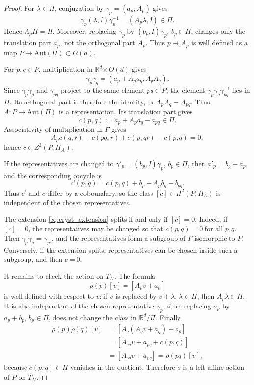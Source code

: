 \documentclass[10pt,a4paper]{amsart}
\begin{document}
\begin{proof}
	For \(\lambda\in\Pi\), conjugation by \(\gamma_p=(a_p,A_p)\) gives
	\[
	\gamma_p(\lambda,I)\gamma_p^{-1}=(A_p\lambda,I)\in\Pi.
	\]
	Hence \(A_p\Pi=\Pi\). Moreover, replacing \(\gamma_p\) by \((b_p,I)\gamma_p\), \(b_p\in\Pi\), changes only the translation part \(a_p\), not the orthogonal part \(A_p\). Thus \(p\mapsto A_p\) is well defined as a map \(P\to\mathrm{Aut}(\Pi)\subset O(d)\).
	
	For \(p,q\in P\), multiplication in \(\mathbb R^d\rtimes O(d)\) gives
	\[
	\gamma_p\gamma_q
	=
	(a_p+A_pa_q,A_pA_q).
	\]
	Since \(\gamma_p\gamma_q\) and \(\gamma_{pq}\) project to the same element \(pq\in P\), the element \(\gamma_p\gamma_q\gamma_{pq}^{-1}\) lies in \(\Pi\). Its orthogonal part is therefore the identity, so \(A_pA_q=A_{pq}\). Thus \(A:P\to\mathrm{Aut}(\Pi)\) is a representation. Its translation part gives
	\[
	c(p,q):=a_p+A_pa_q-a_{pq}\in\Pi.
	\]
	Associativity of multiplication in \(\Gamma\) gives
	\[
	A_pc(q,r)-c(pq,r)+c(p,qr)-c(p,q)=0,
	\]
	hence \(c\in Z^2(P,\Pi_A)\).
	
	If the representatives are changed to \(\gamma'_p=(b_p,I)\gamma_p\), \(b_p\in\Pi\), then \(a'_p=b_p+a_p\), and the corresponding cocycle is
	\[
	c'(p,q)
	=
	c(p,q)+b_p+A_pb_q-b_{pq}.
	\]
	Thus \(c'\) and \(c\) differ by a coboundary, so the class \([c]\in H^2(P,\Pi_A)\) is independent of the chosen representatives.
	
	The extension \eqref{eq:cryst_extension} splits if and only if \([c]=0\). Indeed, if \([c]=0\), the representatives may be changed so that \(c(p,q)=0\) for all \(p,q\). Then \(\gamma_p\gamma_q=\gamma_{pq}\), and the representatives form a subgroup of \(\Gamma\) isomorphic to \(P\). Conversely, if the extension splits, representatives can be chosen inside such a subgroup, and then \(c=0\).
	
	It remains to check the action on \(T_\Pi\). The formula
	\[
	\rho(p)[v]=[A_pv+a_p]
	\]
	is well defined with respect to \(v\): if \(v\) is replaced by \(v+\lambda\), \(\lambda\in\Pi\), then \(A_p\lambda\in\Pi\). It is also independent of the chosen representative \(\gamma_p\), since replacing \(a_p\) by \(a_p+b_p\), \(b_p\in\Pi\), does not change the class in \(\mathbb R^d/\Pi\). Finally,
	\[
	\begin{aligned}
		\rho(p)\rho(q)[v]
		&=[A_p(A_qv+a_q)+a_p]  \\
		&=[A_{pq}v+a_{pq}+c(p,q)] \\
		&=[A_{pq}v+a_{pq}]
		=\rho(pq)[v],
	\end{aligned}
	\]
	because \(c(p,q)\in\Pi\) vanishes in the quotient. Therefore \(\rho\) is a left affine action of \(P\) on \(T_\Pi\).
\end{proof}
\end{document}
